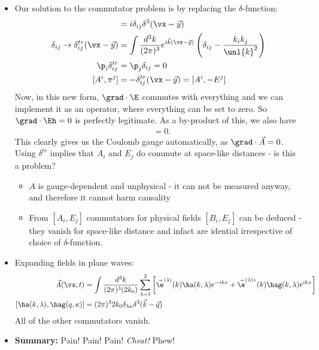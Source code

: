 \documentclass[a4paper, 11pt, normalem]{report}
\begin{document}
\begin{itemize}
    \item Our solution to the commutator problem is by replacing the $\delta$-function:
        \begin{align}
            [A^i,\pi^j] &= i\delta_{ij}\delta^3(\vx-\vec{y}) \\
            \delta_{ij} \to \delta_{ij}^{tr}(\vx-\vec{y}) &= \int \frac{d^3k}{(2\pi)^3} e^{i\vec{k}(\vx-\vec{y})}\left(\delta_{ij}-\frac{k_ik_j}{\unl{k}^2}\right) \\
            \p_i\delta_{ij}^{tr} &= \p_j\delta_{ij} = 0 \\
            [A^i,\pi^j] &= -\delta_{ij}^{tr}(\vx-\vec{y}) = [A^i,-E^j]
        \end{align}
        Now, in this new form, $\grad\cdot\E$ commutes with everything and we can implement it as an operator, where everything can be set to zero.
        So $\grad\cdot\Eh=0$ is perfectly legitimate.
        As a by-product of this, we also have
        \begin{align}
            [\grad\cdot\vec{A}_i,\Eh_j] &= 0.
        \end{align}
        This clearly gives us the Coulomb gauge automatically, as $\grad\cdot\vec{A}=0$.\\
        Using $\delta^{tr}$ implies that $A_i$ and $E_j$ do commute at space-like distances - is this a problem?
        \begin{itemize}
            \item $A$ is gauge-dependent and unphysical - it can not be measured anyway, and therefore it cannot harm causality 
            \item From $[A_i,E_j]$ commutators for physical fields $[B_i,E_j]$ can be deduced - they vanish for space-like distance and infact are idential irrespective of choice of $\delta$-function.
        \end{itemize}
    \item Expanding fields in plane waves:
        \begin{align}
            \vec{A}(\vx,t) &= \int\frac{d^3k}{(2\pi)^3(2k_0)} \sum_{\lambda=1}^2 \left[\vec{\e}^{(\lambda)}(k)\ha(k,\lambda)e^{-ikx} + \vec{\e}^{(\lambda)*}(k)\hag(k,\lambda)e^{ikx}\right] \\
            [\ha(k,\lambda),\hag(q,\kappa)] &= (2\pi)^32k_0\delta_{\lambda\kappa}\delta^3(\vec{k}-\vec{q})
        \end{align}
        All of the other commutators vanish.
    \item \textbf{Summary:} Pain! Pain! Pain! \textit{Cheat!} Phew!
\end{itemize}
\end{document}
